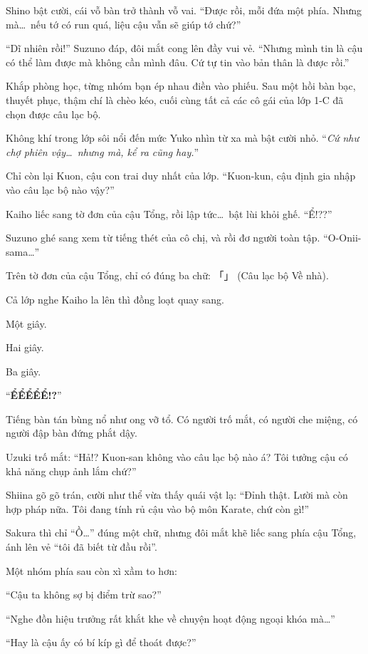 \documentclass[../main.tex]{subfiles}
\begin{document}
Shino bật cười, cái vỗ bàn trở thành vỗ vai. ``Được rồi, mỗi đứa một phía. Nhưng mà\dots\ nếu tớ có run quá, liệu cậu vẫn sẽ giúp tớ chứ?''

``Dĩ nhiên rồi!'' Suzuno đáp, đôi mắt cong lên đầy vui vẻ. ``Nhưng mình tin là cậu có thể làm được mà không cần mình đâu. Cứ tự tin vào bản thân là được rồi.''

Khắp phòng học, từng nhóm bạn ép nhau điền vào phiếu. Sau một hồi bàn bạc, thuyết phục, thậm chí là chèo kéo, cuối cùng tất cả các cô gái của lớp 1-C đã chọn được câu lạc bộ.

Không khí trong lớp sôi nổi đến mức Yuko nhìn từ xa mà bật cười nhỏ. ``\textit{Cứ như chợ phiên vậy\dots\ nhưng mà, kể ra cũng hay.}''

Chỉ còn lại Kuon, cậu con trai duy nhất của lớp. ``Kuon-kun, cậu định gia nhập vào câu lạc bộ nào vậy?''

Kaiho liếc sang tờ đơn của cậu Tổng, rồi lập tức\dots\ bật lùi khỏi ghế. ``Ể!??''

Suzuno ghé sang xem từ tiếng thét của cô chị, và rồi đơ người toàn tập. ``O-Onii-sama\dots''

Trên tờ đơn của cậu Tổng, chỉ có đúng ba chữ: 「」 (Câu lạc bộ Về nhà).

Cả lớp nghe Kaiho la lên thì đồng loạt quay sang.

Một giây.

Hai giây.

Ba giây.

``\textbf{ỂỂỂỂỂ!?}''

Tiếng bàn tán bùng nổ như ong vỡ tổ. Có người trố mắt, có người che miệng, có người đập bàn đứng phắt dậy.

Uzuki trố mắt: ``Hả!? Kuon-san không vào câu lạc bộ nào á? Tôi tưởng cậu có khả năng chụp ảnh lắm chứ?''

Shiina gõ gõ trán, cười như thể vừa thấy quái vật lạ: ``Đỉnh thật. Lười mà còn hợp pháp nữa. Tôi đang tính rủ cậu vào bộ môn Karate, chứ còn gì!''

Sakura thì chỉ ``Ồ\dots'' đúng một chữ, nhưng đôi mắt khẽ liếc sang phía cậu Tổng, ánh lên vẻ ``tôi đã biết từ đầu rồi''.

Một nhóm phía sau còn xì xầm to hơn:

``Cậu ta không sợ bị điểm trừ sao?''

``Nghe đồn hiệu trưởng rất khắt khe về chuyện hoạt động ngoại khóa mà\dots''

``Hay là cậu ấy có bí kíp gì để thoát được?''
\end{document}
